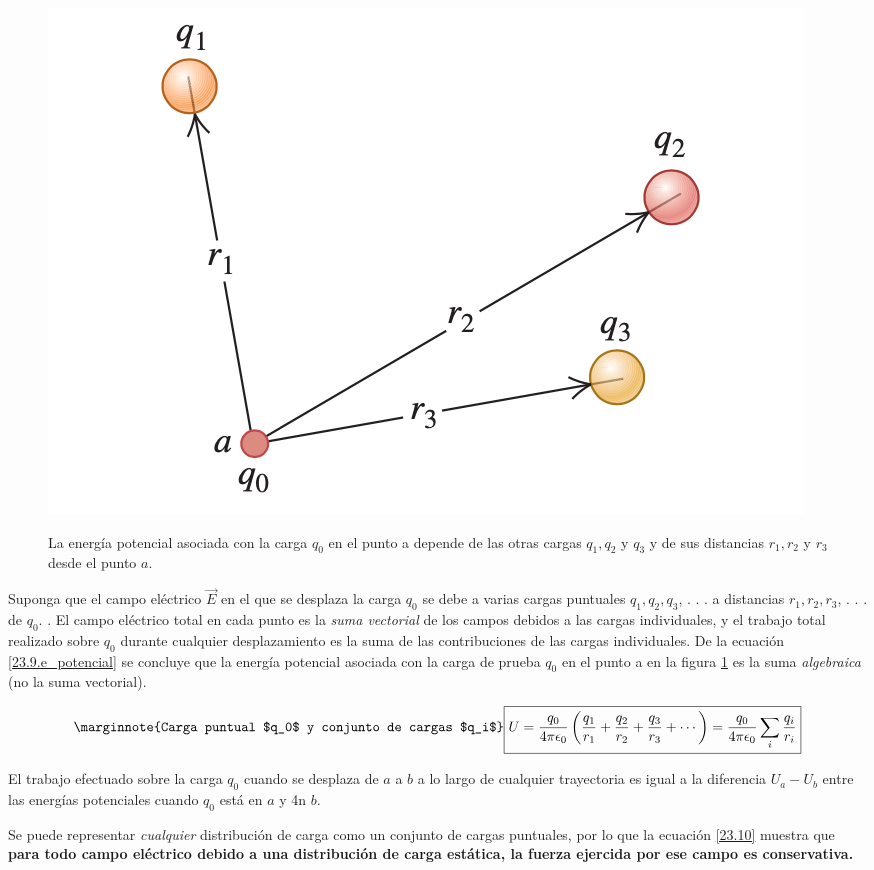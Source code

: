 \begin{figure}[h]
\centering
\caption{La energía potencial asociada con la carga $q_0$ en el punto a depende de las otras cargas $q_1, q_2$ y $q_3$ y de sus distancias $r_1, r_2$ y $r_3$ desde el punto $a$.}
\includegraphics[scale=0.4]{fig/e_potencial_varias}
\label{fig:e_potencial_varias}
\end{figure}

Suponga que el campo eléctrico $\vec{E}$ en el que se desplaza la carga $q_0$ se debe a varias cargas puntuales $q_1, q_2, q_3$, . . . a distancias $r_1, r_2, r_3$, . . . de $q_0$. . El campo eléctrico total en cada punto es la \textit{suma vectorial} de los campos debidos a las cargas individuales, y el trabajo total realizado sobre $q_0$ durante cualquier desplazamiento es la suma de las contribuciones de las cargas individuales. De la ecuación \ref{23.9.e_potencial} se concluye que la energía potencial asociada con la carga de prueba $q_0$ en el punto a en la figura \ref{fig:e_potencial_varias} es la suma \textit{algebraica} (no la suma vectorial).

\begin{equation}\label{23.10}\marginnote{Carga puntual $q_0$ y conjunto de cargas $q_i$}
\boxed{U=\frac{q_0}{4\pi\epsilon_0}\left(\frac{q_1}{r_1}+\frac{q_2}{r_2}+\frac{q_3}{r_3}+\cdots \right)=\frac{q_0}{4\pi\epsilon_0}\sum_{i}\frac{q_i}{r_i}}
\end{equation}

El trabajo efectuado sobre la carga $q_0$ cuando se desplaza de $a$ a $b$ a lo largo de cualquier trayectoria es igual a la diferencia $U_a-U_b$ entre las energías potenciales cuando $q_0$ está en $a$ y 4n $b$.

Se puede representar \textit{cualquier} distribución de carga como un conjunto de cargas puntuales, por lo que la ecuación \ref{23.10} muestra que \textbf{para todo campo eléctrico debido a una distribución de carga estática, la fuerza ejercida por ese campo es conservativa.}

